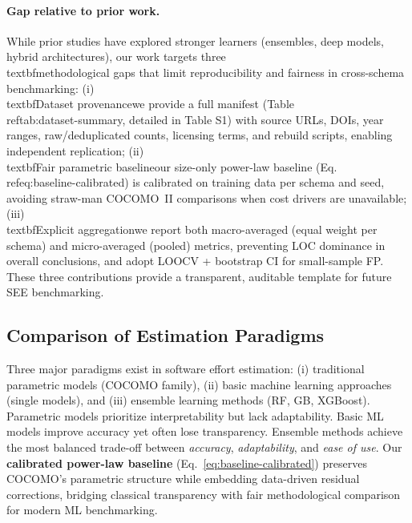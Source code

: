\documentclass{ieeeaccess}
\begin{document}
\paragraph{Gap relative to prior work.}
While prior studies have explored stronger learners (ensembles, deep models, hybrid architectures), our work targets three \\textbf{methodological gaps} that limit reproducibility and fairness in cross-schema benchmarking:
(i) \\textbf{Dataset provenance}\textemdash we provide a full manifest (Table~\\ref{tab:dataset-summary}, detailed in Table S1) with source URLs, DOIs, year ranges, raw/deduplicated counts, licensing terms, and rebuild scripts, enabling independent replication;
(ii) \\textbf{Fair parametric baseline}\textemdash our size-only power-law baseline (Eq.~\\ref{eq:baseline-calibrated}) is calibrated on training data per schema and seed, avoiding straw-man COCOMO~II comparisons when cost drivers are unavailable;
(iii) \\textbf{Explicit aggregation}\textemdash we report both macro-averaged (equal weight per schema) and micro-averaged (pooled) metrics, preventing LOC dominance in overall conclusions, and adopt LOOCV + bootstrap CI for small-sample FP.
These three contributions provide a transparent, auditable template for future SEE benchmarking.

\subsection{Comparison of Estimation Paradigms}

Three major paradigms exist in software effort estimation: 
(i) traditional parametric models (COCOMO family), 
(ii) basic machine learning approaches (single models), and 
(iii) ensemble learning methods (RF, GB, XGBoost).  
Parametric models prioritize interpretability but lack adaptability.  
Basic ML models improve accuracy yet often lose transparency.  
Ensemble methods achieve the most balanced trade-off between 
\textit{accuracy}, \textit{adaptability}, and \textit{ease of use}.  
Our \textbf{calibrated power-law baseline} (Eq.~\ref{eq:baseline-calibrated}) preserves COCOMO's parametric structure 
while embedding data-driven residual corrections, 
bridging classical transparency with fair methodological comparison for modern ML benchmarking.
\end{document}
